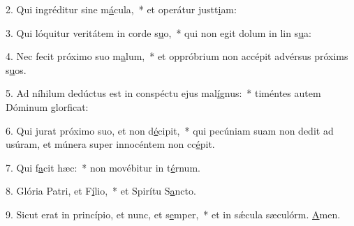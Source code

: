 2. Qui ingréditur sine m\uline{á}cula,~* et operátur justt\uline{i}am:\par 
3. Qui lóquitur veritátem in corde s\uline{u}o,~* qui non egit dolum in lin s\uline{u}a:\par 
4. Nec fecit próximo suo m\uline{a}lum,~* et oppróbrium non accépit advérsus próxims s\uline{u}os.\par 
5. Ad níhilum dedúctus est in conspéctu ejus mal\uline{í}gnus:~* timéntes autem Dóminum glorf\uline{i}cat:\par 
6. Qui jurat próximo suo, et non d\uline{é}cipit,~* qui pecúniam suam non dedit ad usúram, et múnera super innocéntem non cc\uline{é}pit.\par 
7. Qui f\uline{a}cit hæc:~* non movébitur in t\uline{é}rnum.\par 
8. Glória Patri, et F\uline{í}lio,~* et Spirítu S\uline{a}ncto.\par 
9. Sicut erat in princípio, et nunc, et s\uline{e}mper,~* et in sǽcula sæculórm. \uline{A}men.\par 
